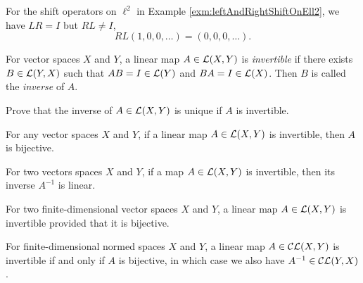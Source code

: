 \begin{exm}
  For the shift operators on $\ell^2$
  in Example \ref{exm:leftAndRightShiftOnEll2},
  we have $LR=I$ but $RL\ne I$,
  \begin{displaymath}
    RL(1,0,0,\ldots) = (0,0,0,\ldots).
  \end{displaymath}
\end{exm}

\begin{defn}
  \label{def:invertibleOps}
  For vector spaces $X$ and $Y$,
  a linear map \mbox{$A\in {\cal L}(X,Y)$} is \emph{invertible}
  if there exists $B\in {\cal L}(Y,X)$
  such that $AB=I\in {\cal L}(Y)$
  and $BA=I\in {\cal L}(X)$. 
  Then $B$ is called the \emph{inverse} of $A$.
\end{defn}

\begin{exc}
  Prove that the inverse of $A\in {\cal L}(X,Y)$ is unique
  if $A$ is invertible.
\end{exc}

\begin{lem}
  \label{lem:invertibleImpliesBijective}
  For any vector spaces $X$ and $Y$, 
  if a linear map $A\in {\cal L}(X,Y)$ is invertible, 
  then $A$ is bijective.
\end{lem}

\begin{lem}
  \label{lem:invertibleCLmapIsLinear}
  For two vectors spaces $X$ and $Y$, 
  if a map $A\in {\cal L}(X,Y)$ is invertible,
  then its inverse $A^{-1}$ is linear.
\end{lem}

\begin{lem}
  \label{lem:bijectiveImpliesInvertibleFiniteDim}
  For two finite-dimensional vector spaces $X$ and $Y$, 
  a linear map $A\in {\cal L}(X,Y)$ is invertible
  provided that it is bijective.
\end{lem}

\begin{thm}
  For finite-dimensional normed spaces $X$ and $Y$,
  a linear map $A\in {\cal CL}(X,Y)$ is invertible
  if and only if $A$ is bijective,
  in which case we also have $A^{-1}\in {\cal CL}(Y,X)$. 
\end{thm}

